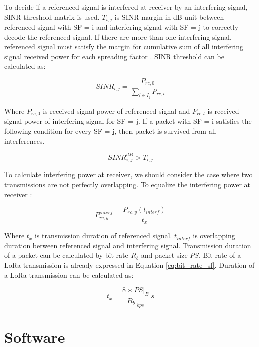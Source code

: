 To decide if a referenced signal is interfered at receiver by an interfering signal, SINR threshold matrix is used. $T_{i,j}$ is SINR margin in dB unit between referenced signal with SF = i and interfering signal with SF = j to correctly decode the referenced signal. If there are more than one interfering signal, referenced signal must satisfy the margin for cumulative sum of all interfering signal received power for each spreading factor \cite{7996384}. SINR threshold can be calculated as:

\begin{equation} \label{eq:sinr_db}
SINR_{i,j} = \dfrac{P_{rc,0}}{\sum_{l \in I_j} P_{rc,l}}
\end{equation}

Where $P_{rc,0}$ is received signal power of referenced signal and $P_{rc,l}$ is received signal power of interfering signal for SF = j. If a packet with SF = i satisfies the following condition for every SF = j, then packet is survived from all interferences.

\begin{equation} \label{eq:sinr_t}
SINR_{i,j}^{dB} > T_{i,j}
\end{equation}

To calculate interfering power at receiver, we should consider the case where two transmissions are not perfectly overlapping. To equalize the interfering power at receiver \cite{7996384}:

\begin{equation} \label{eq:p_interference}
P_{rc,y}^{interf} = \dfrac{P_{rc,y}(t_{interf})}{t_{x}}
\end{equation}

Where $t_{x}$ is transmission duration of referenced signal. $t_{interf}$ is overlapping duration between referenced signal and interfering signal. Transmission duration of a packet can be calculated by bit rate $R_{b}$ and packet size $PS$. Bit rate of a LoRa transmission is already expressed in Equation \ref{eq:bit_rate_sf}. Duration of a LoRa transmission can be calculated as:

\begin{equation} \label{eq:transmission_duration}
t_{x} = \dfrac{8 \times PS|_{B}}{R_{b}|_{bps}}  \ s
\end{equation}

\section{Software}

